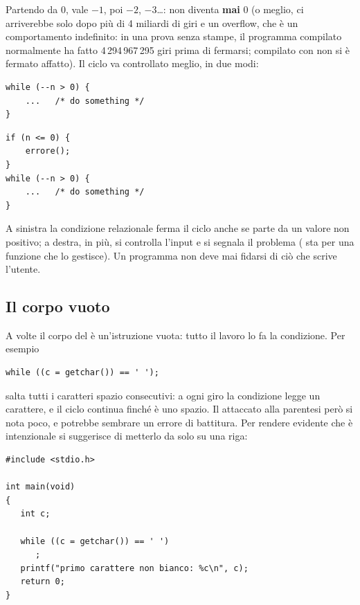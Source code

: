 Partendo da 0,  vale $-1$, poi $-2$, $-3$\dots: non diventa
\textbf{mai} 0 (o meglio, ci arriverebbe solo dopo più di 4 miliardi di giri
e un overflow, che è un comportamento indefinito: in una prova senza
stampe, il programma compilato normalmente ha fatto 4\,294\,967\,295 giri
prima di fermarsi; compilato con  non si è fermato affatto). Il
ciclo va controllato meglio, in due modi:

\begin{affianco}[0.5][c]
\begin{lstlisting}[style=c]
while (--n > 0) {
    ...   /* do something */
}
\end{lstlisting}
\risultato
\begin{lstlisting}[style=c]
if (n <= 0) {
    errore();
}
while (--n > 0) {
    ...   /* do something */
}
\end{lstlisting}
\end{affianco}

A sinistra la condizione relazionale  ferma il ciclo anche se
 parte da un valore non positivo; a destra, in più, si controlla
l'input e si segnala il problema ( sta per una funzione che lo
gestisce). Un programma non deve mai fidarsi di ciò che scrive l'utente.

\subsection{Il corpo vuoto}

A volte il corpo del  è un'istruzione vuota: tutto il lavoro lo
fa la condizione. Per esempio

\begin{lstlisting}[style=c]
while ((c = getchar()) == ' ');
\end{lstlisting}

salta tutti i caratteri spazio consecutivi: a ogni giro la condizione legge
un carattere, e il ciclo continua finché è uno spazio. Il \code{;} attaccato
alla parentesi però si nota poco, e potrebbe sembrare un errore di
battitura. Per rendere evidente che è intenzionale si suggerisce di metterlo
da solo su una riga:

\begin{affianco}[0.5][c]
\begin{lstlisting}[style=c, name=salta.c]
#include <stdio.h>

int main(void)
{
   int c;

   while ((c = getchar()) == ' ')
      ;
   printf("primo carattere non bianco: %c\n", c);
   return 0;
}
\end{lstlisting}
\risultato
{}
\end{affianco}

